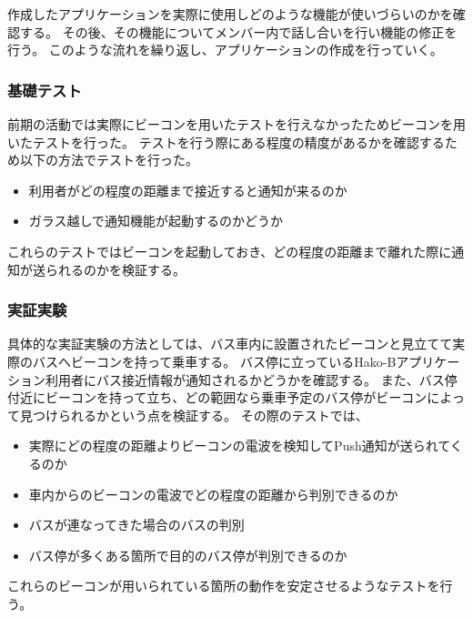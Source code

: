 \documentclass[openany,11pt,papersize]{jsbook}
\begin{document}
作成したアプリケーションを実際に使用しどのような機能が使いづらいのかを確認する。
その後、その機能についてメンバー内で話し合いを行い機能の修正を行う。
このような流れを繰り返し、アプリケーションの作成を行っていく。


\subsubsection{基礎テスト}
前期の活動では実際にビーコンを用いたテストを行えなかったためビーコンを用いたテストを行った。
テストを行う際にある程度の精度があるかを確認するため以下の方法でテストを行った。

\begin{itemize}

\item 利用者がどの程度の距離まで接近すると通知が来るのか
\item ガラス越しで通知機能が起動するのかどうか

\end{itemize}

これらのテストではビーコンを起動しておき、どの程度の距離まで離れた際に通知が送られるのかを検証する。



\subsubsection{実証実験}

具体的な実証実験の方法としては、バス車内に設置されたビーコンと見立てて実際のバスへビーコンを持って乗車する。
バス停に立っているHako-Bアプリケーション利用者にバス接近情報が通知されるかどうかを確認する。
また、バス停付近にビーコンを持って立ち、どの範囲なら乗車予定のバス停がビーコンによって見つけられるかという点を検証する。
その際のテストでは、
\begin{itemize}

\item 実際にどの程度の距離よりビーコンの電波を検知してPush通知が送られてくるのか
\item 車内からのビーコンの電波でどの程度の距離から判別できるのか
\item バスが連なってきた場合のバスの判別
\item バス停が多くある箇所で目的のバス停が判別できるのか

\end{itemize}
これらのビーコンが用いられている箇所の動作を安定させるようなテストを行う。
\end{document}
